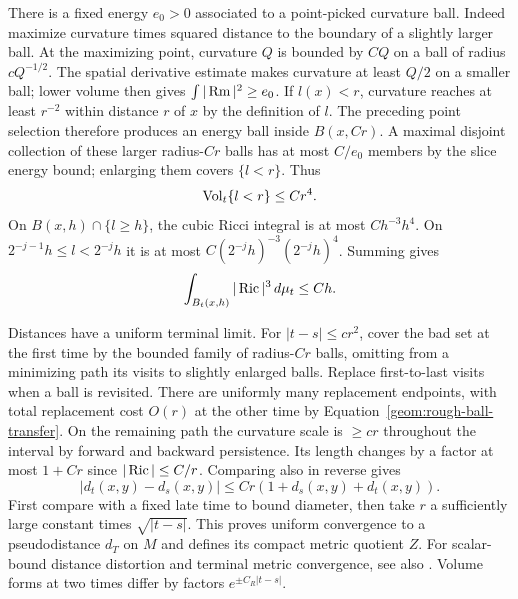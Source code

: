 There is a fixed energy $e_0>0$ associated to a point-picked
curvature ball. Indeed maximize curvature times squared distance to
the boundary of a slightly larger ball. At the maximizing point,
curvature $Q$ is bounded by $CQ$ on a ball of radius $cQ^{-1/2}$.
The spatial derivative estimate makes curvature at least $Q/2$ on a
smaller ball; lower volume then gives $\int|\operatorname{Rm}|^2\geq e_0$.
If $l(x)<r$, curvature reaches at least $r^{-2}$ within distance $r$
of $x$ by the definition of $l$. The preceding point selection
therefore produces an energy ball inside $B(x,Cr)$. A maximal
disjoint collection of these larger radius-$Cr$ balls has at most
$C/e_0$ members by the slice energy bound; enlarging them covers
$\{l<r\}$. Thus
\begin{equation}\label{geom:bad-volume}
 \operatorname{Vol}_t\{l<r\}\leq Cr^4.
\end{equation}
On $B(x,h)\cap\{l\geq h\}$, the cubic Ricci integral is at most
$Ch^{-3}h^4$. On $2^{-j-1}h\leq l<2^{-j}h$ it is at most
$C(2^{-j}h)^{-3}(2^{-j}h)^4$. Summing gives
\begin{equation}\label{geom:ricci-L3}
 \int_{B_t(x,h)}|\operatorname{Ric}|^3\,d\mu_t\leq Ch.
\end{equation}

Distances have a uniform terminal limit. For $|t-s|\leq cr^2$,
cover the bad set at the first time by the bounded family of
radius-$Cr$ balls, omitting from a minimizing path its visits to
slightly enlarged balls. Replace first-to-last visits when a ball is
revisited. There are uniformly many replacement endpoints, with
total replacement cost $O(r)$ at the other time by
Equation~\eqref{geom:rough-ball-transfer}. On the remaining path the
curvature scale is $\geq cr$ throughout the interval by forward and
backward persistence. Its length changes by a factor at most $1+Cr$
since $|\operatorname{Ric}|\leq C/r$. Comparing also in reverse gives
\[
 |d_t(x,y)-d_s(x,y)|\leq Cr(1+d_s(x,y)+d_t(x,y)).
\]
First compare with a fixed late time to bound diameter, then take
$r$ a sufficiently large constant times $\sqrt{|t-s|}$. This proves
uniform convergence to a pseudodistance $d_T$ on $M$ and defines its
compact metric quotient $Z$. For scalar-bound distance distortion and
terminal metric convergence, see also
\cite[Theorem~1.1 and Corollary~1.2]{BamlerZhangII}.
Volume forms at two times differ by factors $e^{\pm C_R|t-s|}$.

